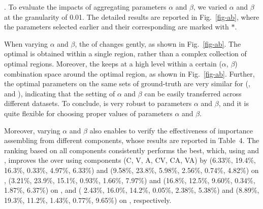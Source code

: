 
.
To evaluate the impacts of aggregating parameters $\alpha$ and $\beta$, we varied $\alpha$ and $\beta$ at the granularity of 0.01.
The detailed results are reported in Fig.~\ref{fig-ab}, where the parameters selected earlier and their corresponding \PairAcc are marked with $*$.

When varying $\alpha$ and $\beta$, the \PairAcc of \ensemblerank changes gently, as shown in Fig.~\ref{fig-ab}.
The optimal \PairAcc is obtained within a single region, rather than a complex collection of optimal regions.
%
Moreover, the \PairAcc keeps at a high level within a certain ($\alpha$, $\beta$) combination space around the optimal region, as shown in Fig.~\ref{fig-ab}.
%
Further, the optimal parameters on the same sets of ground-truth are very similar for (\aan, \aminer and \magdata), indicating that the setting of $\alpha$ and $\beta$ can be easily transferred across different datasets.
To conclude, \ensemblerank is very robust to parameters $\alpha$ and $\beta$, and it is quite flexible for choosing proper values of parameters $\alpha$ and $\beta$.

Moreover, varying $\alpha$ and $\beta$ also enables to verify the effectiveness of importance assembling from different components, whose results are reported in Table~4.
The ranking based on all components consistently performs the best, which, using \recom and \fcita, improves the \PairAcc over using components (C, V, A, CV, CA, VA) by (6.33\%, 19.4\%, 16.3\%, 0.33\%, 4.97\%, 6.33\%) and (9.58\%, 23.8\%, 5.98\%, 2.56\%, 0.74\%, 4.82\%) on \aan, (3.21\%, 23.9\%, 15.1\%, 0.93\%, 1.66\%, 7.97\%) and (16.8\%, 12.5\%, 9.60\%, 0.34\%, 1.87\%, 6.37\%) on \aminer, and ( 2.43\%, 16.0\%, 14.2\%, 0.05\%, 2.38\%, 5.38\%) and (8.89\%, 19.3\%, 11.2\%, 1.43\%, 0.77\%, 9.65\%) on \magdata, respectively.

